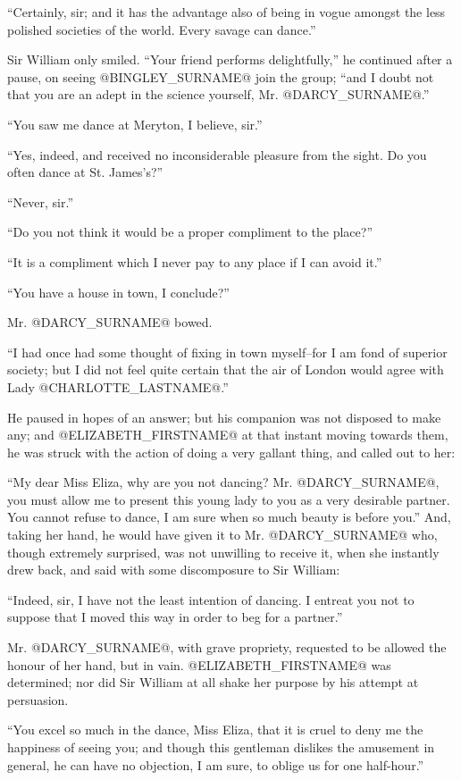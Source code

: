 ``Certainly, sir; and it has the advantage also of being in vogue amongst
the less polished societies of the world. Every savage can dance.''

Sir William only smiled. ``Your friend performs delightfully,'' he
continued after a pause, on seeing @BINGLEY_SURNAME@ join the group; ``and I doubt
not that you are an adept in the science yourself, Mr. @DARCY_SURNAME@.''

``You saw me dance at Meryton, I believe, sir.''

``Yes, indeed, and received no inconsiderable pleasure from the sight. Do
you often dance at St. James's?''

``Never, sir.''

``Do you not think it would be a proper compliment to the place?''

``It is a compliment which I never pay to any place if I can avoid it.''

``You have a house in town, I conclude?''

Mr. @DARCY_SURNAME@ bowed.

``I had once had some thought of fixing in town myself--for I am fond
of superior society; but I did not feel quite certain that the air of
London would agree with Lady @CHARLOTTE_LASTNAME@.''

He paused in hopes of an answer; but his companion was not disposed
to make any; and @ELIZABETH_FIRSTNAME@ at that instant moving towards them, he was
struck with the action of doing a very gallant thing, and called out to
her:

``My dear Miss Eliza, why are you not dancing? Mr. @DARCY_SURNAME@, you must allow
me to present this young lady to you as a very desirable partner. You
cannot refuse to dance, I am sure when so much beauty is before you.''
And, taking her hand, he would have given it to Mr. @DARCY_SURNAME@ who, though
extremely surprised, was not unwilling to receive it, when she instantly
drew back, and said with some discomposure to Sir William:

``Indeed, sir, I have not the least intention of dancing. I entreat you
not to suppose that I moved this way in order to beg for a partner.''

Mr. @DARCY_SURNAME@, with grave propriety, requested to be allowed the honour of
her hand, but in vain. @ELIZABETH_FIRSTNAME@ was determined; nor did Sir William at
all shake her purpose by his attempt at persuasion.

``You excel so much in the dance, Miss Eliza, that it is cruel to deny
me the happiness of seeing you; and though this gentleman dislikes the
amusement in general, he can have no objection, I am sure, to oblige us
for one half-hour.''

